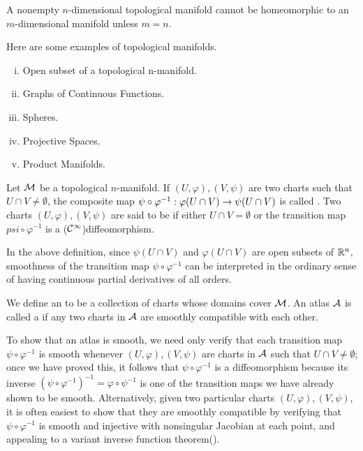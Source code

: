\documentclass[11pt,a4paper]{article}
\begin{document}
\begin{proposition}
A nonempty $n$-dimensional topological manifold cannot be homeomorphic to an $m$-dimensional manifold unless $m=n$.
\end{proposition}

\begin{example}
Here are some examples of topological manifolds.
\begin{enumerate}[(i)]
    \item Open subset of a topological n-manifold.
    \item Graphs of Continuous Functions.
    \item Spheres.
    \item Projective Spaces.
    \item Product Manifolds.
\end{enumerate}
\end{example}

\begin{definition}
Let $\mathcal{M}$ be a topological $n$-manifold. If $(U,\varphi), (V,\psi)$ are two charts such that $U\cap V\neq \emptyset$, the composite map $\psi\circ \varphi^{-1}:\varphi(U\cap V)\rightarrow \psi(U\cap V)$ is called . Two charts $(U,\varphi),(V,\psi)$ are said to be  if either $U\cap V = \emptyset$ or the transition map $psi\circ\varphi^{-1}$ is a ($\mathcal{C}^\infty$)diffeomorphism.
\end{definition}

\begin{remark}
In the above definition, since $\psi(U\cap V)$ and $\varphi(U\cap V)$ are open subsets of $\mathbb{R}^n$, smoothness of the transition map $\psi\circ\varphi^{-1}$ can be interpreted in the ordinary sense of having continuous partial derivatives of all orders.
\end{remark}

\begin{definition}
We define an  to be a collection of charts whose domains cover $\mathcal{M}$. An atlas $\mathcal{A}$ is called a  if any two charts in $\mathcal{A}$ are smoothly compatible with each other.
\end{definition}

\begin{remark}
To show that an atlas is smooth, we need only verify that each transition map $\psi\circ\varphi^{-1}$ is smooth whenever $(U,\varphi), (V,\psi)$ are charts in $\mathcal{A}$ such that $U\cap V\neq \emptyset$; once we have proved this, it follows that $\psi\circ\varphi^{-1}$ is a diffeomorphism because its  inverse $(\psi\circ\varphi^{-1})^{-1} = \varphi\circ\psi^{-1}$ is one of the transition maps we have already shown to be smooth. Alternatively, given two particular charts $(U,\varphi), (V,\psi)$, it is often easiest to show that they are smoothly compatible by verifying that $\psi\circ\varphi^{-1}$ is smooth and injective with nonsingular Jacobian at each point, and appealing to a variant inverse function theorem(\cite[Corollary C.36]{JohnLee}).
\end{remark}
\end{document}
